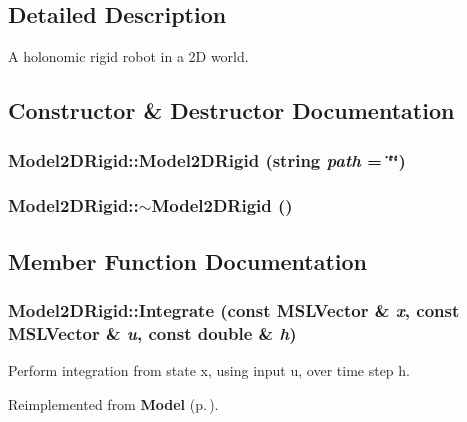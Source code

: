 \subsection{Detailed Description}
A holonomic rigid robot in a 2D world.



\subsection{Constructor \& Destructor Documentation}
\subsubsection{\setlength{\rightskip}{0pt plus 5cm}Model2DRigid::Model2DRigid (string {\em path} = \char`\"{}\char`\"{})}\label{classModel2DRigid_a0}


\subsubsection{\setlength{\rightskip}{0pt plus 5cm}Model2DRigid::$\sim$Model2DRigid ()\hspace{0.3cm}{\tt  [inline, virtual]}}\label{classModel2DRigid_a1}




\subsection{Member Function Documentation}
\subsubsection{ Model2DRigid::Integrate (const {\bf MSLVector} \& {\em x}, const {\bf MSLVector} \& {\em u}, const double \& {\em h})\hspace{0.3cm}{\tt  [virtual]}}\label{classModel2DRigid_a2}


Perform integration from state x, using input u, over time step h.



Reimplemented from {\bf Model} {\rm (p.\,\pageref{classModel_a5})}.

